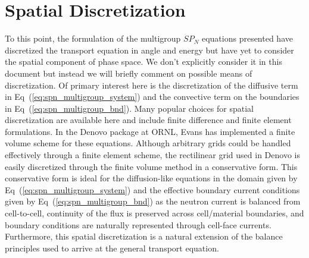\section{Spatial Discretization}
\label{sec:spatial_discretization}
To this point, the formulation of the multigroup $SP_N$ equations
presented have discretized the transport equation in angle and energy
but have yet to consider the spatial component of phase space. We
don't explicitly consider it in this document but instead we will
briefly comment on possible means of discretization. Of primary
interest here is the discretization of the diffusive term in
Eq~(\ref{eq:spn_multigroup_system}) and the convective term on the
boundaries in Eq~(\ref{eq:spn_multigroup_bnd}). Many popular choices
for spatial discretization are available here and include finite
difference and finite element formulations. In the Denovo package at
ORNL, Evans has implemented a finite volume scheme for these
equations. Although arbitrary grids could be handled effectively
through a finite element scheme, the rectilinear grid used in Denovo
is easily discretized through the finite volume method in a
conservative form. This conservative form is ideal for the
diffusion-like equations in the domain given by
Eq~(\ref{eq:spn_multigroup_system}) and the effective boundary current
conditions given by Eq~(\ref{eq:spn_multigroup_bnd}) as the neutron
current is balanced from cell-to-cell, continuity of the flux is
preserved across cell/material boundaries, and boundary conditions are
naturally represented through cell-face currents. Furthermore, this
spatial discretization is a natural extension of the balance
principles used to arrive at the general transport equation.

